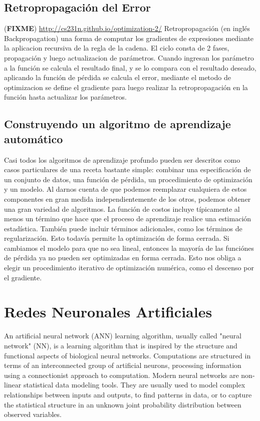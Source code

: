 \documentclass[a4paper,11pt,spanish]{book}
\newcommand*{\FIXME}[1]{{(\textbf{FIXME}) {#1}}}
\begin{document}
    \subsection{Retropropagación del Error}
      \FIXME{\url{http://cs231n.github.io/optimization-2/}}
      Retropropagación (en inglés Backpropagation) una forma  de computar los gradientes de expresiones mediante la aplicacion recursiva de la regla de la cadena.
      El ciclo consta de 2 fases, propagación y luego actualizacion de parámetros. Cuando ingresan los parámetro a la función se calcula el resultado final, y se lo compara con el resultado 
      deseado, aplicando la función de pérdida se calcula el error, mediante el metodo de optimizacion se define el gradiente para luego realizar la retropropagación en la función hasta 
      actualizar los parámetros.

    \subsection{Construyendo un algoritmo de aprendizaje automático}
      Casi todos los algoritmos de aprendizaje profundo pueden ser descritos como casos particulares de una receta bastante simple: 
      combinar una especificación de un conjunto de datos, una función de pérdida, un procedimiento de optimización y un modelo.
      Al darnos cuenta de que podemos reemplazar cualquiera de estos componentes en gran medida independientemente de los otros, podemos obtener una gran variedad de algoritmos.
      La función de costos incluye típicamente al menos un término que hace que el proceso de aprendizaje realice una estimación estadística. También puede incluir términos adicionales, 
      como los términos de regularización. Esto todavía permite la optimización de forma cerrada. 
      Si cambiamos el modelo para que no sea lineal, entonces la mayoría de las funciónes de pérdida ya no pueden ser optimizadas en forma cerrada. 
      Esto nos obliga a elegir un procedimiento iterativo de optimización numérica, como el descenso por el gradiente.
    
    \section{Redes Neuronales Artificiales}
      
 \iffalse
      An artificial neural network (ANN) learning algorithm, usually called "neural network" (NN), is a learning algorithm that is inspired by the structure and functional aspects 
      of biological neural networks. Computations are structured in terms of an interconnected group of artificial neurons, processing information using a connectionist approach 
      to computation. Modern neural networks are non-linear statistical data modeling tools. They are usually used to model complex relationships between inputs and outputs, 
      to find patterns in data, or to capture the statistical structure in an unknown joint probability distribution between observed variables.
      
\end{document}

